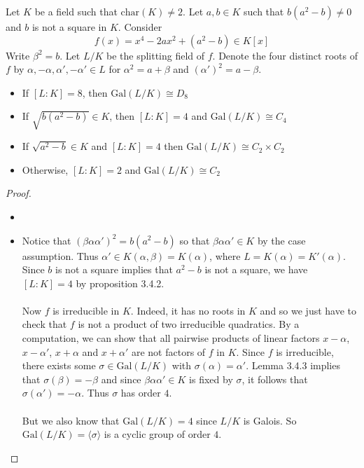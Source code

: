 \documentclass[a4paper]{article}
\begin{document}
\begin{thm}{}{} Let $K$ be a field such that $\text{char}(K)\neq 2$. Let $a,b\in K$ such that $b(a^2-b)\neq 0$ and $b$ is not a square in $K$. Consider $$f(x)=x^4-2ax^2+(a^2-b)\in K[x]$$ Write $\beta^2=b$. Let $L/K$ be the splitting field of $f$. Denote the four distinct roots of $f$ by $\alpha,-\alpha,\alpha',-\alpha'\in L$ for $\alpha^2=a+\beta$ and $(\alpha')^2=a-\beta$. 
\begin{itemize}
\item If $[L:K]=8$, then $\text{Gal}(L/K)\cong D_8$
\item If $\sqrt{b(a^2-b)}\in K$, then $[L:K]=4$ and $\text{Gal}(L/K)\cong C_4$
\item If $\sqrt{a^2-b}\in K$ and $[L:K]=4$ then $\text{Gal}(L/K)\cong C_2\times C_2$
\item Otherwise, $[L:K]=2$ and $\text{Gal}(L/K)\cong C_2$
\end{itemize} \tcbline
\begin{proof}~\\
\begin{itemize}
\item 
\item Notice that $(\beta\alpha\alpha')^2=b(a^2-b)$ so that $\beta\alpha\alpha'\in K$ by the case assumption. Thus $\alpha'\in K(\alpha,\beta)=K(\alpha)$, where $L=K(\alpha)=K'(\alpha)$. Since $b$ is not a square implies that $a^2-b$ is not a square, we have $[L:K]=4$ by proposition 3.4.2. \\~\\

Now $f$ is irreducible in $K$. Indeed, it has no roots in $K$ and so we just have to check that $f$ is not a product of two irreducible quadratics. By a computation, we can show that all pairwise products of linear factors $x-\alpha$, $x-\alpha'$, $x+\alpha$ and $x+\alpha'$ are not factors of $f$ in $K$. Since $f$ is irreducible, there exists some $\sigma\in\text{Gal}(L/K)$ with $\sigma(\alpha)=\alpha'$. Lemma 3.4.3 implies that $\sigma(\beta)=-\beta$ and since $\beta\alpha\alpha'\in K$ is fixed by $\sigma$, it follows that $\sigma(\alpha')=-\alpha$. Thus $\sigma$ has order $4$. \\~\\

But we also know that $\text{Gal}(L/K)=4$ since $L/K$ is Galois. So $\text{Gal}(L/K)=\langle\sigma\rangle$ is a cyclic group of order $4$. 


\end{itemize}
\end{proof}
\end{thm}
\end{document}
